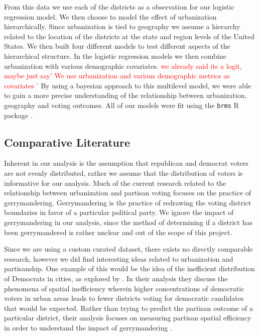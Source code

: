 \documentclass[12pt]{article}
\newcommand{\red}[1]{\textcolor{red}{#1}}
\begin{document}
From this data we use each of the districts as a observation for our logistic regression model. We then choose to model the effect of urbanization hierarchically. Since urbanization is tied to geography we assume a hierarchy related to the location of the districts at the state and region levels of the United States. We then built four different models to test different aspects of the hierarchical structure.
In the logistic regression models we then combine urbanization with various demographic covariates.
\red{we already said its a logit, maybe just say' We use urbanization and various demographic  metrics as covariates '}
By using a bayesian approach to this multilevel model, we were able to gain a more precise understanding of the relationship between urbanization, geography and voting outcomes. All of our models were fit using the \texttt{brms} R package \parencite{brms}. 




\subsection*{Comparative Literature}
Inherent in our analysis is the assumption that republican and democrat voters are not evenly distributed, rather we assume that the distribution of voters is informative for our analysis. Much of the current research related to the relationship between urbanization and partisan voting focuses on the practice of gerrymandering. Gerrymandering is the practice of redrawing the voting district boundaries in favor of a particular political party. We ignore the impact of gerrymandering in our analysis, since the method of determining if a district has been gerrymandered is rather unclear and out of the scope of this project.

Since we are using a custom curated dataset, there exists no directly comparable research, however we did find interesting ideas related to urbanization and partisanship. One example of this would be the idea of the inefficient distribution of Democrats in cities, as explored by \cite{spatialefficency}. In their analysis they discuss the phenomena of spatial inefficiency wherein higher concentrations of democratic voters in urban areas leads to fewer districts voting for democratic candidates that would be expected. Rather than trying to predict the partisan outcome of a particular district, their analysis focuses on measuring partisan spatial efficiency in order to understand the impact of gerrymandering \parencite{spatialefficency}. 
\end{document}
